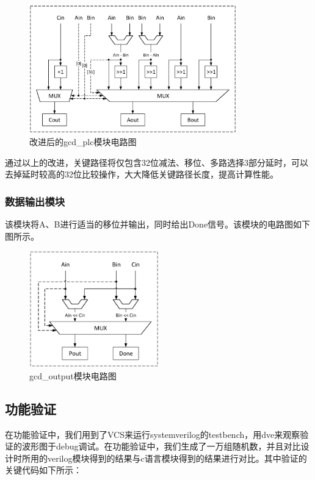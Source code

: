\documentclass[12pt]{article}
\begin{document}
\begin{figure}[H]
\begin{center}
\includegraphics[width=0.8\textwidth]{./yhc_hp/gcd_plc.eps}
\caption{改进后的gcd\_plc模块电路图}
\end{center}
\end{figure}

通过以上的改进，关键路径将仅包含32位减法、移位、多路选择3部分延时，可以去掉延时较高的32位比较操作，大大降低关键路径长度，提高计算性能。

\subsubsection{数据输出模块}
该模块将A、B进行适当的移位并输出，同时给出Done信号。该模块的电路图如下图所示。

\begin{figure}[H]
\begin{center}
\includegraphics[width=0.5\textwidth]{./yhc_hp/gcd_output.eps}
\caption{gcd\_output模块电路图}
\end{center}
\end{figure}

\subsection{功能验证}
在功能验证中，我们用到了VCS来运行systemverilog的testbench，用dve来观察验证的波形图于debug调试。在功能验证中，我们生成了一万组随机数，并且对比设计时所用的verilog模块得到的结果与c语言模块得到的结果进行对比。其中验证的关键代码如下所示：
\end{document}
